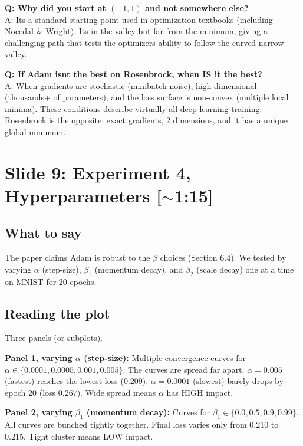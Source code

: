 \documentclass[11pt, letterpaper]{article}
\begin{document}
\begin{qabox}
\textbf{Q: Why did you start at $(-1, 1)$ and not somewhere else?}\\
A: Its a standard starting point used in optimization textbooks (including Nocedal \& Wright). Its in the valley but far from the minimum, giving a challenging path that tests the optimizers ability to follow the curved narrow valley.

\textbf{Q: If Adam isnt the best on Rosenbrock, when IS it the best?}\\
A: When gradients are stochastic (minibatch noise), high-dimensional (thousands+ of parameters), and the loss surface is non-convex (multiple local minima). These conditions describe virtually all deep learning training. Rosenbrock is the opposite: exact gradients, 2 dimensions, and it has a unique global minimum.
\end{qabox}


\section{Slide 9: Experiment 4, Hyperparameters \textnormal{\color{muted}[$\sim$1:15]}}

\subsection{What to say}

The paper claims Adam is robust to the $\beta$ choices (Section 6.4). We tested by varying $\alpha$ (step-size), $\beta_1$ (momentum decay), and $\beta_2$ (scale decay) one at a time on MNIST for 20 epochs.

\subsection{Reading the plot}
Three panels (or subplots).

\textbf{Panel 1, varying $\alpha$ (step-size):} Multiple convergence curves for $\alpha \in \{0.0001, 0.0005, 0.001, 0.005\}$. The curves are spread far apart. $\alpha = 0.005$ (fastest) reaches the lowest loss (0.209). $\alpha = 0.0001$ (slowest) barely drops by epoch 20 (loss 0.267). Wide spread means $\alpha$ has HIGH impact.

\textbf{Panel 2, varying $\beta_1$ (momentum decay):} Curves for $\beta_1 \in \{0.0, 0.5, 0.9, 0.99\}$. All curves are bunched tightly together. Final loss varies only from 0.210 to 0.215. Tight cluster means LOW impact.
\end{document}

